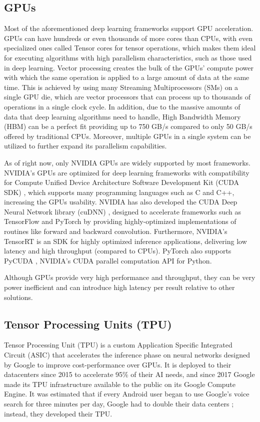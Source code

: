 \subsection{GPUs}
Most of the aforementioned deep learning frameworks support GPU acceleration. GPUs can have hundreds or even thousands of more cores than CPUs, with even specialized ones called Tensor cores for tensor operations, which makes them ideal for executing algorithms with high parallelism characteristics, such as those used in deep learning. Vector processing creates the bulk of the GPUs' compute power with which the same operation is applied to a large amount of data at the same time. This is achieved by using many Streaming Multiprocessors (SMs) on a single GPU die, which are vector processors that can process up to thousands of operations in a single clock cycle. In addition, due to the massive amounts of data that deep learning algorithms need to handle, High Bandwidth Memory (HBM) can be a perfect fit providing up to 750 GB/s compared to only 50 GB/s offered by traditional CPUs. Moreover, multiple GPUs in a single system can be utilized to further expand its parallelism capabilities.

As of right now, only NVIDIA GPUs are widely supported by most frameworks. NVIDIA's GPUs are optimized for deep learning frameworks with compatibility for Compute Unified Device Architecture Software Development Kit (CUDA SDK) \cite{NVIDIA-CUDA}, which supports many programming languages such as C and C++, increasing the GPUs usability. NVIDIA has also developed the CUDA Deep Neural Network library (cuDNN) \cite{cuDNN-Efficient-Primitives-for-Deep-Learning} \cite{NVIDIA-cuDNN}, designed to accelerate frameworks such as TensorFlow and PyTorch by providing highly-optimized implementations of routines like forward and backward convolution. Furthermore, NVIDIA's TensorRT \cite{NVIDIA-TensorRT} is an SDK for high\-ly optimized inference applications, delivering low latency and high throughput (compared to CPUs). PyTorch also supports PyCUDA \cite{NVIDIA-PyCUDA}, NVIDIA's CUDA parallel computation API for Python.

Although GPUs provide very high performance and throughput, they can be very power inefficient and can introduce high latency per result relative to other solutions.

\subsection{Tensor Processing Units (TPU)}
Tensor Processing Unit (TPU) \cite{In-Datacenter-Performance-Analysis-of-a-Tensor-Processing-Unit} is a custom Application Specific Integrated Circuit (ASIC) that accelerates the inference phase on neural networks designed by Google to improve cost-performance over GPUs. It is deployed to their datacenters since 2015 to accelerate 95\% of their AI needs, and since 2017 Google made its TPU infrastructure available to the public on its Google Compute Engine. It was estimated that if every Android user began to use Google's voice search for three minutes per day, Google had to double their data centers \cite{Google-opens-up-about-its-Tensor-Processing-Unit}; instead, they developed their TPU.

